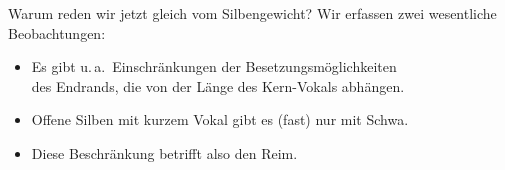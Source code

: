 % 
%      
% 
% 
% 
% 
% 
% 
% 
% 
% 
% 

\begin{frame}
  {Warum reden wir jetzt gleich vom Silbengewicht?}
  \pause
  Wir erfassen zwei wesentliche Beobachtungen:
  \pause
  \Zeile
  \begin{itemize}[<+->]
    \item Es gibt u.\,a.\ Einschränkungen der Besetzungsmöglichkeiten\\
      des \alert{Endrands}, die von der \alert{Länge des Kern-Vokals} abhängen.
    \item Offene Silben mit kurzem Vokal gibt es (fast) nur mit Schwa.
  \Zeile
\item Diese Beschränkung betrifft also den \alert{Reim}.
  \end{itemize} 
\end{frame}

